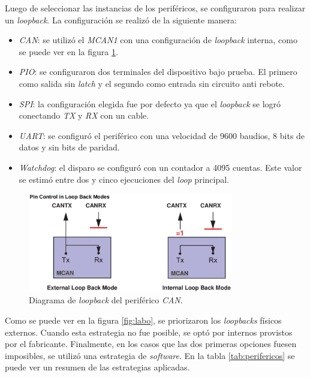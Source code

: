 Luego de seleccionar las instancias de los periféricos, se configuraron para realizar un \emph{loopback}.
La configuración se realizó de la siguiente manera:

\begin{itemize}
    \item \emph{CAN}: se utilizó el \emph{MCAN1} con una configuración de \emph{loopback} interna, como se puede ver en la figura \ref{fig:canloopback}.
    \item \emph{PIO}: se configuraron dos terminales del dispositivo bajo prueba.
        El primero como salida sin \emph{latch} y el segundo como entrada sin circuito anti rebote.
    \item \emph{SPI}: la configuración elegida fue por defecto ya que el \emph{loopback} se logró conectando \emph{TX} y \emph{RX} con un cable.
    \item \emph{UART}: se configuró el periférico con una velocidad de 9600 baudios, 8 bits de datos y sin bits de paridad.
    \item \emph{Watchdog}: el disparo se configuró con un contador a 4095 cuentas.
        Este valor se estimó entre dos y cinco ejecuciones del \emph{loop} principal.
\end{itemize}

\begin{figure}[htbp]
	\centering
	\includegraphics[width=0.8\textwidth]{./Figures/canloopback.png}
    \caption{Diagrama de \emph{loopback} del periférico \emph{CAN}\protect\footnotemark.}
	\label{fig:canloopback}
\end{figure}


Como se puede ver en la figura \ref{fig:labo}, se priorizaron los \emph{loopbacks} físicos externos.
Cuando esta estrategia no fue posible, se optó por internos provistos por el fabricante.
Finalmente, en los casos que las dos primeras opciones fuesen imposibles, se utilizó una estrategia de \emph{software}.
En la tabla \ref{tab:perifericos} se puede ver un resumen de las estrategias aplicadas.

